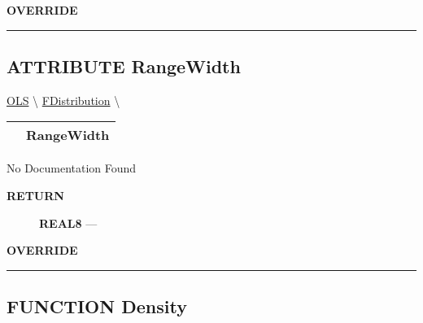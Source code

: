 \par
\begin{description}
\item [\colorbox{tagtype}{\color{white} \textbf{\textsf{OVERRIDE}}}] 
\end{description}



\rule{\linewidth}{0.5pt}
\subsection*{\textsf{\colorbox{headtoc}{\color{white} ATTRIBUTE}
RangeWidth}}

\hypertarget{ecldoc:linearregression.ols.fdistribution.rangewidth}{}
\hspace{0pt} \hyperlink{ecldoc:linearregression.ols}{OLS} \textbackslash 
\hspace{0pt} \hyperlink{ecldoc:linearregression.ols.fdistribution}{FDistribution} \textbackslash 

{\renewcommand{\arraystretch}{1.5}
\begin{tabularx}{\textwidth}{|>{\raggedright\arraybackslash}l|X|}
\hline
\hspace{0pt}\mytexttt{\color{red} } & \textbf{RangeWidth} \\
\hline
\end{tabularx}
}

\par





No Documentation Found








\par
\begin{description}
\item [\colorbox{tagtype}{\color{white} \textbf{\textsf{RETURN}}}] \textbf{REAL8} --- 
\end{description}






\par
\begin{description}
\item [\colorbox{tagtype}{\color{white} \textbf{\textsf{OVERRIDE}}}] 
\end{description}



\rule{\linewidth}{0.5pt}
\subsection*{\textsf{\colorbox{headtoc}{\color{white} FUNCTION}
Density}}

